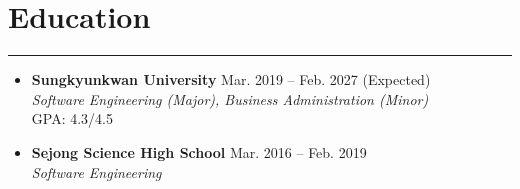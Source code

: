 \documentclass[letterpaper,10pt]{article}
\begin{document}
\section*{Education}
\hrule
\vspace{4pt}
\begin{itemize}

    \item[]
        \textbf{Sungkyunkwan University}
        \hfill Mar. 2019 -- Feb. 2027 (Expected) \\
        \textit{Software Engineering (Major), Business Administration (Minor)} \\
        GPA: 4.3/4.5

    \item[]
        \textbf{Sejong Science High School}
        \hfill Mar. 2016 -- Feb. 2019 \\
        \textit{Software Engineering}

\end{itemize}
\end{document}
